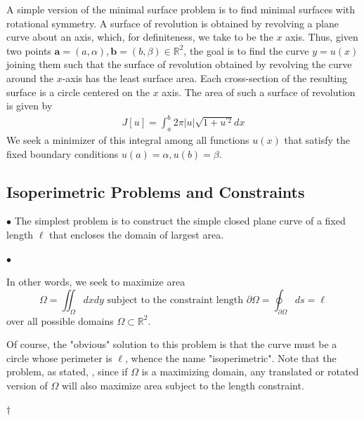 \documentclass{article}
\begin{document}
\begin{exma}\label{exm:aodmczcd}
A simple version of the minimal surface problem is to find minimal surfaces with rotational symmetry. A surface of revolution is obtained by revolving a plane curve about an axis, which, for definiteness, we take to be the $x$ axis. Thus, given two points $\mathbf{a}=(a, \alpha), \mathbf{b}=(b, \beta) \in \mathbb{R}^{2}$, the goal is to find the curve $y=u(x)$ joining them such that the surface of revolution obtained by revolving the curve around the $x$-axis has the least surface area. Each cross-section of the resulting surface is a circle centered on the $x$ axis. The area of such a surface of revolution is given by
\begin{align}
J[u]=\int_{a}^{b} 2 \pi|u| \sqrt{1+u^{\prime 2}} d x\label{eq:inbdf}
\end{align}
We seek a minimizer of this integral among all functions $u(x)$ that satisfy the fixed boundary conditions $u(a)=\alpha, u(b)=\beta$.
\end{exma}

\subsection{Isoperimetric Problems and Constraints}
$\bullet$  The simplest  problem is to construct the simple closed plane curve of a fixed length $\ell$ that encloses the domain of largest area. 

$\bullet$  

In other words, we seek to maximize area $$\text{$\Omega=\iint_{\Omega} d x d y$ subject to the constraint length $\partial \Omega=\oint_{\partial \Omega} d s=\ell$}$$
over all possible domains $\Omega \subset \mathbb{R}^{2}$. 
\begin{rema}
Of course, the "obvious" solution to this problem is that the curve must be a circle whose perimeter is $\ell$, whence the name "isoperimetric". Note that the problem, as stated, , since if $\Omega$ is a maximizing domain, any translated or rotated version of $\Omega$ will also maximize area subject to the length constraint.
\end{rema}

$\dagger$  
\end{document}
